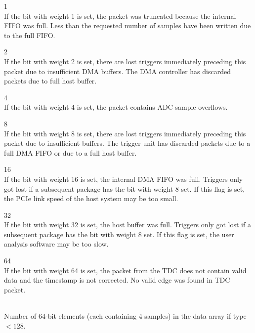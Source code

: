     \par
    \indent{} 1\\
    \indent If the bit with weight 1 is set, the packet was truncated because the internal FIFO was full. Less than the requested number of samples have been written due to the full FIFO.\par
    \indent{} 2\\
    \indent If the bit with weight 2 is set, there are lost triggers immediately preceding this packet due to insufficient DMA buffers. The DMA controller has discarded packets due to full host buffer.\par
    \indent{} 4\\
    \indent If the bit with weight 4 is set, the packet contains ADC sample overflows.\par
    \indent{} 8\\
    \indent If the bit with weight 8 is set, there are lost triggers immediately preceding this packet due to insufficient buffers. The trigger unit has discarded packets due to a full DMA FIFO or due to a full host buffer.\par
    \indent{} 16\\
    \indent If the bit with weight 16 is set, the internal DMA FIFO was full. Triggers only got lost if a subsequent package has the bit with weight 8 set. If this flag is set, the PCIe link speed of the host system may be too small.\par
    \indent{} 32\\
    \indent If the bit with weight 32 is set, the host buffer was full. Triggers only got lost if a subsequent package has the bit with weight 8 set. If this flag is set, the user analysis software may be too slow.\par
    \indent{} 64\\
    \indent If the bit with weight 64 is set, the packet from the TDC does not contain valid data and the timestamp is not corrected. No valid edge was found in TDC packet.\par

    \\
    Number of 64-bit elements (each containing 4 samples) in the data array if type $< 128$.\par

